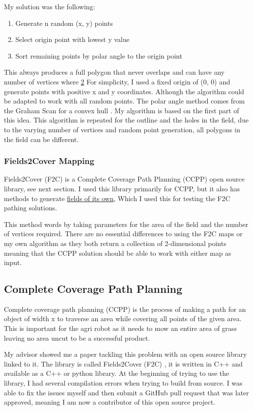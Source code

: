 \documentclass[progress]{cmpreport}
\begin{document}
My solution was the following:
\begin{enumerate}
	\item{Generate n random (x, y) points}
	\item{Select origin point with lowest y value}
	\item{Sort remaining points by polar angle to the origin point}
\end{enumerate}

This always produces a full polygon that never overlaps and can have any number of vertices where \hyperref[Mapping]{2}
For simplicity, I used a fixed origin of (0, 0) and generate points with positive x and y coordinates. Although the algorithm could be adapted to work with all random points.
The polar angle method comes from the Graham Scan for a convex hull \cite{geeksforgeeks2023}.
My algorithm is based on the first part of this idea.
This algorithm is repeated for the outline and the holes in the field, due to the varying number of vertices and random point generation, all polygons in the field can be different.


\subsubsection{Fields2Cover Mapping}
Fields2Cover (F2C) is a Complete Coverage Path Planning (CCPP) open source library, see next section.
I used this library primarily for CCPP, but it also has methods to generate \hyperref[F2CMapping]{fields of its own},
Which I used this for testing the F2C pathing solutions.

This method words by taking parameters for the area of the field and the number of vertices required.
There are no essential differences to using the F2C maps or my own algorithm as they both return a collection of 2-dimensional points meaning that the CCPP solution should be able to work with either map as input.

\subsection{Complete Coverage Path Planning}
Complete coverage path planning (CCPP) is the process of making a path for an object of width x to traverse an area while covering all points of the given area.
This is important for the agri robot as it needs to mow an entire area of grass leaving no area uncut to be a successful product.

My advisor showed me a paper tackling this problem with an open source library linked to it.
The library is called Fields2Cover (F2C) \cite{fields2cover2023github}, it is written in C++ and available as a C++ or python library.
At the beginning of trying to use the library, I had several compilation errors when trying to build from source.
I was able to fix the issues myself and then submit a GitHub pull request that was later approved, meaning I am now a contributor of this open source project.
\end{document}
